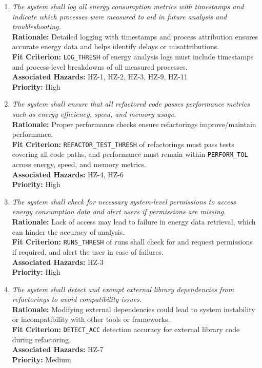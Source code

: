 \documentclass{article}
\begin{document}
\begin{enumerate}[label=SCR \arabic*., wide=0pt, leftmargin=*]

    \item \emph{The system shall log all energy consumption metrics with timestamps and indicate which processes were measured to aid in future analysis and troubleshooting.}\\
    {\bf Rationale:} Detailed logging with timestamps and process attribution ensures accurate energy data and helps identify delays or misattributions.\\
    {\bf Fit Criterion:} \texttt{LOG\_THRESH} of energy analysis logs must include timestamps and process-level breakdowns of all measured processes.\\
    {\bf Associated Hazards:} HZ-1, HZ-2, HZ-3, HZ-9, HZ-11\\
    {\bf Priority:} High

    \item \emph{The system shall ensure that all refactored code passes performance metrics such as energy efficiency, speed, and memory usage.}\\
    {\bf Rationale:} Proper performance checks ensure refactorings improve/maintain performance.\\
    {\bf Fit Criterion:} \texttt{REFACTOR\_TEST\_THRESH} of refactorings must pass tests covering all code paths, and performance must remain within \texttt{PERFORM\_TOL} across energy, speed, and memory metrics.\\
    {\bf Associated Hazards:} HZ-4, HZ-6\\
    {\bf Priority:} High

    \item \emph{The system shall check for necessary system-level permissions to access energy consumption data and alert users if permissions are missing.}\\
    {\bf Rationale:} Lack of access may lead to failure in energy data retrieval, which can hinder the accuracy of analysis.\\
    {\bf Fit Criterion:} \texttt{RUNS\_THRESH} of runs shall check for and request permissions if required, and alert the user in case of failures.\\
    {\bf Associated Hazards:} HZ-3\\
    {\bf Priority:} High

    \item \emph{The system shall detect and exempt external library dependencies from refactorings to avoid compatibility issues.}\\
    {\bf Rationale:} Modifying external dependencies could lead to system instability or incompatibility with other tools or frameworks.\\
    {\bf Fit Criterion:} \texttt{DETECT\_ACC} detection accuracy for external library code during refactoring.\\
    {\bf Associated Hazards:} HZ-7\\
    {\bf Priority:} Medium


\end{enumerate}
\end{document}
